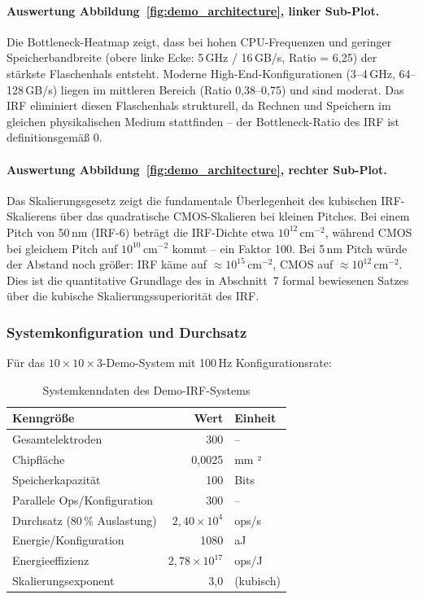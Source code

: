 ﻿\documentclass[a4paper,12pt]{scrreprt}
\theoremstyle{definition}
\begin{document}
\paragraph{Auswertung Abbildung~\ref{fig:demo_architecture}, linker Sub-Plot.}
Die Bottleneck-Heatmap zeigt, dass bei hohen CPU-Frequenzen und geringer
Speicherbandbreite (obere linke Ecke: 5\,GHz / 16\,GB/s, Ratio = 6,25)
der stärkste Flaschenhals entsteht. Moderne High-End-Konfigura\-tionen
(3--4\,GHz, 64--128\,GB/s) liegen im mittleren Bereich (Ratio 0,38--0,75)
und sind moderat. Das IRF eliminiert diesen Flaschenhals strukturell,
da Rechnen und Speichern im gleichen physikalischen Medium stattfinden --
der Bottleneck-Ratio des IRF ist definitionsgemäß 0.

\paragraph{Auswertung Abbildung~\ref{fig:demo_architecture}, rechter Sub-Plot.}
Das Skalierungsgesetz zeigt die fundamentale Überlegenheit des kubischen
IRF-Skalierens über das quadratische CMOS-Skalieren bei kleinen Pitches.
Bei einem Pitch von 50\,nm (IRF-6) beträgt die IRF-Dichte etwa $10^{12}$\,cm$^{-2}$,
während CMOS bei gleichem Pitch auf $10^{10}$\,cm$^{-2}$ kommt -- ein
Faktor 100. Bei 5\,nm Pitch würde der Abstand noch größer: IRF käme auf
$\approx 10^{15}$\,cm$^{-2}$, CMOS auf $\approx 10^{12}$\,cm$^{-2}$.
Dies ist die quantitative Grundlage des in Abschnitt~7 formal bewiesenen
Satzes über die kubische Skalierungssuperiorität des IRF.

\subsubsection{Systemkonfiguration und Durchsatz}

Für das $10 \times 10 \times 3$-Demo-System mit 100\,Hz Konfigurationsrate:

\begin{table}[H]
	\centering
	\caption{Systemkenndaten des Demo-IRF-Systems}
	\label{tab:system_kenndaten}
	\begin{tabular}{lrl}
		\toprule
		\textbf{Kenngröße} & \textbf{Wert} & \textbf{Einheit} \\
		\midrule
		Gesamtelektroden              & 300          & -- \\
		Chipfläche                    & 0,0025       & mm ² \\
		Speicherkapazität             & 100          & Bits \\
		Parallele Ops/Konfiguration   & 300          & -- \\
		Durchsatz (80\,\% Auslastung) & $2{,}40 \times 10^4$ & ops/s \\
		Energie/Konfiguration         & 1080         & aJ \\
		Energieeffizienz              & $2{,}78 \times 10^{17}$ & ops/J \\
		Skalierungsexponent           & 3,0          & (kubisch) \\
		\bottomrule
	\end{tabular}
\end{table}
\end{document}
